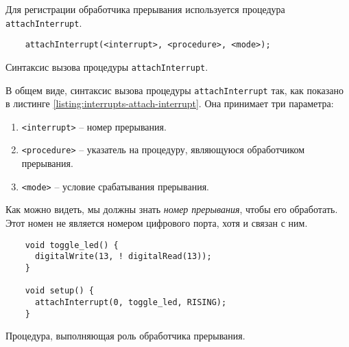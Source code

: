 \documentclass[../sparc.tex]{subfiles}
\begin{document}
Для регистрации обработчика прерывания используется процедура
\texttt{attachInterrupt}.

\begin{listing}[ht]
  \begin{verbatim}
    attachInterrupt(<interrupt>, <procedure>, <mode>);
  \end{verbatim}
  \caption{Синтаксис вызова процедуры \texttt{attachInterrupt}.}
  \label{listing:interrupts-attach-interrupt}
\end{listing}

В общем виде, синтаксис вызова процедуры \texttt{attachInterrupt} так, как
показано в листинге \ref{listing:interrupts-attach-interrupt}.  Она принимает
три параметра:
\begin{enumerate}
\item \texttt{<interrupt>} -- номер прерывания.
\item \texttt{<procedure>} -- указатель на процедуру, являющуюся обработчиком
  прерывания.
\item \texttt{<mode>} -- условие срабатывания прерывания.
\end{enumerate}

Как можно видеть, мы должны знать \emph{номер прерывания}, чтобы его обработать.
Этот номен не является номером цифрового порта, хотя и связан с ним.

\begin{listing}[ht]
  \begin{verbatim}
    void toggle_led() {
      digitalWrite(13, ! digitalRead(13));
    }

    void setup() {
      attachInterrupt(0, toggle_led, RISING);
    }
  \end{verbatim}
  \caption{Процедура, выполняющая роль обработчика прерывания.}
  \label{listing:interrupts-handler}
\end{listing}
\end{document}
